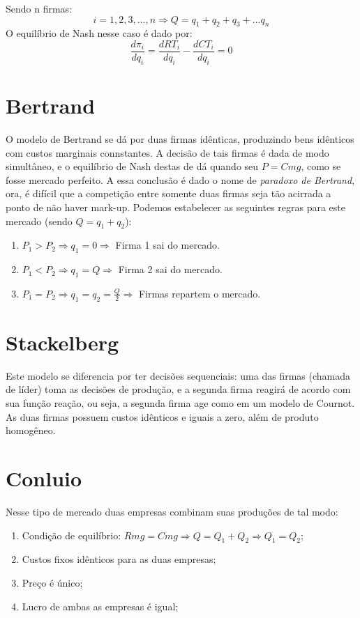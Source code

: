 \documentclass[12pt,a4paper,oneside,brazil]{abntex2}
\begin{document}
Sendo n firmas:
\[ i = 1, 2 , 3, ..., n \Rightarrow Q = q_1 + q_2 + q_3 + ... q_n\]
O equilíbrio de Nash nesse caso é dado por:
\[  \frac{d \pi_i}{d q_i} = \frac{d RT_i}{d q_i} - \frac{d CT_i}{d q_i} = 0\]

\section{Bertrand}
O modelo de Bertrand se dá por duas firmas idênticas, produzindo bens idênticos com custos marginais connstantes. A decisão de tais firmas é dada de modo simultâneo,  e o equilíbrio de Nash destas de dá quando seu $P = Cmg$, como se fosse mercado perfeito. A essa conclusão é dado o nome de \emph{paradoxo de Bertrand}, ora, é difícil que a competição entre somente duas firmas seja tão acirrada a ponto de não haver mark-up. Podemos estabelecer as seguintes regras para este mercado (sendo $Q = q_1 + q_2$):
\begin{enumerate}
\item $P_1 > P_2  \Rightarrow q_1 = 0 \Rightarrow$ Firma 1 sai do mercado.
\item $P_1 <  P_2  \Rightarrow  q_1 = Q \Rightarrow$ Firma 2 sai do mercado.
\item $ P_1 = P_2 \Rightarrow q_1 = q_2 = \frac{Q}{2} \Rightarrow$ Firmas repartem o mercado.
\end{enumerate}

\section{Stackelberg}
Este modelo se diferencia por ter decisões sequenciais: uma das firmas (chamada de líder) toma as decisões de produção, e a segunda firma reagirá de acordo com sua função reação, ou seja, a segunda firma age como em um modelo de Cournot. As duas firmas possuem custos idênticos e iguais a zero, além de produto homogêneo. 

\section{Conluio}
Nesse tipo de mercado duas empresas combinam suas produções de tal modo:

\begin{enumerate}
\item Condição de equilíbrio: $ Rmg =Cmg \Rightarrow Q = Q_1 + Q_2 \Rightarrow Q_1 = Q_2 $;
\item Custos fixos idênticos para as duas empresas;
\item Preço é único;
\item Lucro de ambas as empresas é igual;
\end{enumerate}
\end{document}
